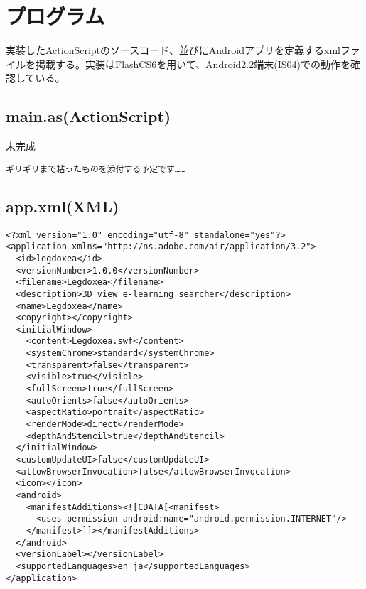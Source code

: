 \chapter{プログラム}
実装したActionScriptのソースコード、並びにAndroidアプリを定義するxmlファイルを掲載する。実装はFlashCS6を用いて、Android2.2端末(IS04)での動作を確認している。

\section{main.as(ActionScript)}
\begin{itembox}[l]{{未完成}}
{\scriptsize
\begin{verbatim}
ギリギリまで粘ったものを添付する予定です……
\end{verbatim}
 }
\end{itembox}

\section{app.xml(XML)}
{\scriptsize
\begin{verbatim}
<?xml version="1.0" encoding="utf-8" standalone="yes"?>
<application xmlns="http://ns.adobe.com/air/application/3.2">
  <id>legdoxea</id>
  <versionNumber>1.0.0</versionNumber>
  <filename>Legdoxea</filename>
  <description>3D view e-learning searcher</description>
  <name>Legdoxea</name>
  <copyright></copyright>
  <initialWindow>
    <content>Legdoxea.swf</content>
    <systemChrome>standard</systemChrome>
    <transparent>false</transparent>
    <visible>true</visible>
    <fullScreen>true</fullScreen>
    <autoOrients>false</autoOrients>
    <aspectRatio>portrait</aspectRatio>
    <renderMode>direct</renderMode>
    <depthAndStencil>true</depthAndStencil>
  </initialWindow>
  <customUpdateUI>false</customUpdateUI>
  <allowBrowserInvocation>false</allowBrowserInvocation>
  <icon></icon>
  <android>
    <manifestAdditions><![CDATA[<manifest>
      <uses-permission android:name="android.permission.INTERNET"/>
    </manifest>]]></manifestAdditions>
  </android>
  <versionLabel></versionLabel>
  <supportedLanguages>en ja</supportedLanguages>
</application>
\end{verbatim}
 }
